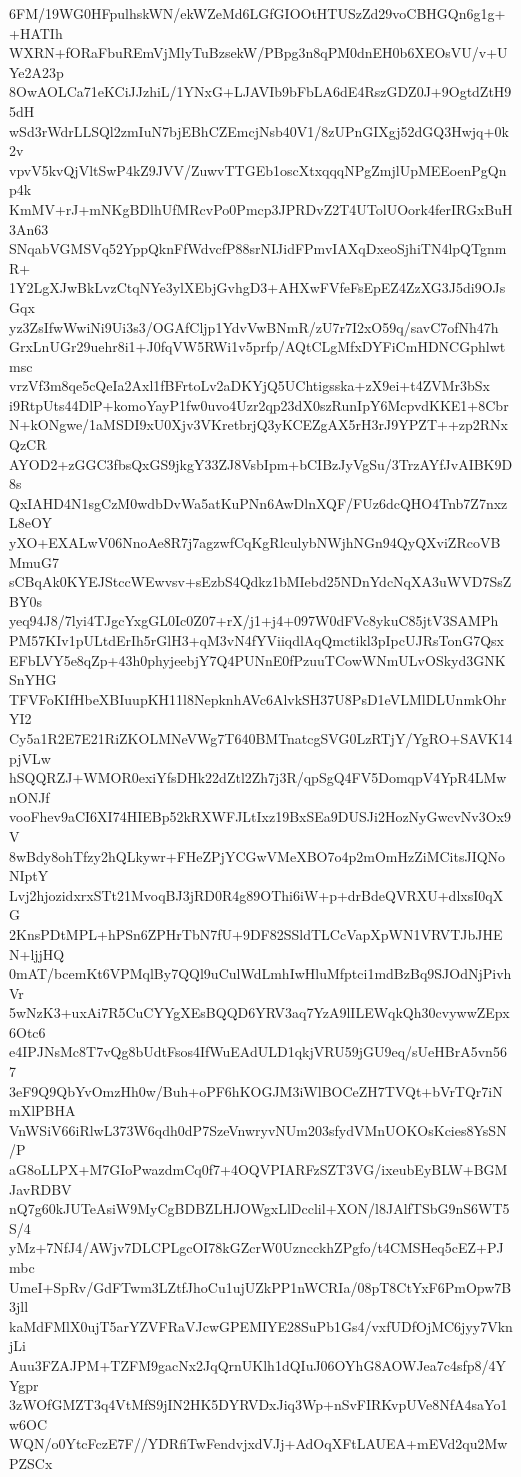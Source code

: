 6FM/19WG0HFpulhskWN/ekWZeMd6LGfGIOOtHTUSzZd29voCBHGQn6g1g++HATIh
WXRN+fORaFbuREmVjMlyTuBzsekW/PBpg3n8qPM0dnEH0b6XEOsVU/v+UYe2A23p
8OwAOLCa71eKCiJJzhiL/1YNxG+LJAVIb9bFbLA6dE4RszGDZ0J+9OgtdZtH95dH
wSd3rWdrLLSQl2zmIuN7bjEBhCZEmcjNsb40V1/8zUPnGIXgj52dGQ3Hwjq+0k2v
vpvV5kvQjVltSwP4kZ9JVV/ZuwvTTGEb1oscXtxqqqNPgZmjlUpMEEoenPgQnp4k
KmMV+rJ+mNKgBDlhUfMRcvPo0Pmcp3JPRDvZ2T4UTolUOork4ferIRGxBuH3An63
SNqabVGMSVq52YppQknFfWdvcfP88srNIJidFPmvIAXqDxeoSjhiTN4lpQTgnmR+
1Y2LgXJwBkLvzCtqNYe3ylXEbjGvhgD3+AHXwFVfeFsEpEZ4ZzXG3J5di9OJsGqx
yz3ZsIfwWwiNi9Ui3s3/OGAfCljp1YdvVwBNmR/zU7r7I2xO59q/savC7ofNh47h
GrxLnUGr29uehr8i1+J0fqVW5RWi1v5prfp/AQtCLgMfxDYFiCmHDNCGphlwtmsc
vrzVf3m8qe5cQeIa2Axl1fBFrtoLv2aDKYjQ5UChtigsska+zX9ei+t4ZVMr3bSx
i9RtpUts44DlP+komoYayP1fw0uvo4Uzr2qp23dX0szRunIpY6McpvdKKE1+8Cbr
N+kONgwe/1aMSDI9xU0Xjv3VKretbrjQ3yKCEZgAX5rH3rJ9YPZT++zp2RNxQzCR
AYOD2+zGGC3fbsQxGS9jkgY33ZJ8VsbIpm+bCIBzJyVgSu/3TrzAYfJvAIBK9D8s
QxIAHD4N1sgCzM0wdbDvWa5atKuPNn6AwDlnXQF/FUz6dcQHO4Tnb7Z7nxzL8eOY
yXO+EXALwV06NnoAe8R7j7agzwfCqKgRlculybNWjhNGn94QyQXviZRcoVBMmuG7
sCBqAk0KYEJStccWEwvsv+sEzbS4Qdkz1bMIebd25NDnYdcNqXA3uWVD7SsZBY0s
yeq94J8/7lyi4TJgcYxgGL0Ic0Z07+rX/j1+j4+097W0dFVc8ykuC85jtV3SAMPh
PM57KIv1pULtdErIh5rGlH3+qM3vN4fYViiqdlAqQmctikl3pIpcUJRsTonG7Qsx
EFbLVY5e8qZp+43h0phyjeebjY7Q4PUNnE0fPzuuTCowWNmULvOSkyd3GNKSnYHG
TFVFoKIfHbeXBIuupKH11l8NepknhAVc6AlvkSH37U8PsD1eVLMlDLUnmkOhrYI2
Cy5a1R2E7E21RiZKOLMNeVWg7T640BMTnatcgSVG0LzRTjY/YgRO+SAVK14pjVLw
hSQQRZJ+WMOR0exiYfsDHk22dZtl2Zh7j3R/qpSgQ4FV5DomqpV4YpR4LMwnONJf
vooFhev9aCI6XI74HIEBp52kRXWFJLtIxz19BxSEa9DUSJi2HozNyGwcvNv3Ox9V
8wBdy8ohTfzy2hQLkywr+FHeZPjYCGwVMeXBO7o4p2mOmHzZiMCitsJIQNoNIptY
Lvj2hjozidxrxSTt21MvoqBJ3jRD0R4g89OThi6iW+p+drBdeQVRXU+dlxsI0qXG
2KnsPDtMPL+hPSn6ZPHrTbN7fU+9DF82SSldTLCcVapXpWN1VRVTJbJHEN+ljjHQ
0mAT/bcemKt6VPMqlBy7QQl9uCulWdLmhIwHluMfptci1mdBzBq9SJOdNjPivhVr
5wNzK3+uxAi7R5CuCYYgXEsBQQD6YRV3aq7YzA9lILEWqkQh30cvywwZEpx6Otc6
e4IPJNsMc8T7vQg8bUdtFsos4IfWuEAdULD1qkjVRU59jGU9eq/sUeHBrA5vn567
3eF9Q9QbYvOmzHh0w/Buh+oPF6hKOGJM3iWlBOCeZH7TVQt+bVrTQr7iNmXlPBHA
VnWSiV66iRlwL373W6qdh0dP7SzeVnwryvNUm203sfydVMnUOKOsKcies8YsSN/P
aG8oLLPX+M7GIoPwazdmCq0f7+4OQVPIARFzSZT3VG/ixeubEyBLW+BGMJavRDBV
nQ7g60kJUTeAsiW9MyCgBDBZLHJOWgxLlDcclil+XON/l8JAlfTSbG9nS6WT5S/4
yMz+7NfJ4/AWjv7DLCPLgcOI78kGZcrW0UzncckhZPgfo/t4CMSHeq5cEZ+PJmbc
UmeI+SpRv/GdFTwm3LZtfJhoCu1ujUZkPP1nWCRIa/08pT8CtYxF6PmOpw7B3jll
kaMdFMlX0ujT5arYZVFRaVJcwGPEMIYE28SuPb1Gs4/vxfUDfOjMC6jyy7VknjLi
Auu3FZAJPM+TZFM9gacNx2JqQrnUKlh1dQIuJ06OYhG8AOWJea7c4sfp8/4YYgpr
3zWOfGMZT3q4VtMfS9jIN2HK5DYRVDxJiq3Wp+nSvFIRKvpUVe8NfA4saYo1w6OC
WQN/o0YtcFczE7F//YDRfiTwFendvjxdVJj+AdOqXFtLAUEA+mEVd2qu2MwPZSCx
